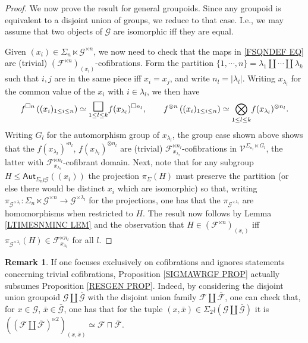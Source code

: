 \documentclass[a4paper,10pt
,draft
]{article}%
\numberwithin{equation}{section}
\numberwithin{figure}{section}
\theoremstyle{definition} %
\newtheorem{remark}[equation]{Remark}%
\newcommand{\F}{\ensuremath{\mathcal F}}
\newcommand{\V}{\ensuremath{\mathcal V}}
\newcommand{\G}{\ensuremath{\mathcal G}}
\newcommand{\1}{\ensuremath{\mathbbm 1}}%
\begin{document}
\begin{proof}
We now prove the result for general groupoids.
Since any groupoid is equivalent to a disjoint union of groups, 
we reduce to that case. I.e., we may assume that two objects of $\G$ are isomorphic iff they are equal.

Given $(x_i) \in \Sigma_n \ltimes \G^{\times n}$,
we now need to check that the maps in \eqref{FSQNDEF EQ}
are (trivial) $\left(\F^{\ltimes n}\right)_{(x_i)}$-cofibrations.
Form the partition 
$\{1,\cdots,n\} = \lambda_1 \amalg \cdots \amalg \lambda_k$
such that $i,j$ are in the same piece iff $x_i=x_j$, and write
$n_l = |\lambda_l|$.
Writing $x_{\lambda_l}$ for the common value of the $x_i$ with $i\in \lambda_l$, we then have
\[
f^{\square n}\left((x_i)_{1\leq i \leq n }\right)
\simeq
\underset{1\leq l \leq k}{\mathlarger{\mathlarger{\mathlarger{\square}}}} f(x_{\lambda_l})^{\square n_l},
\qquad
f^{\otimes n}\left((x_i)_{1\leq i \leq n }\right)
\simeq
\underset{1\leq l \leq k}{\bigotimes} f(x_{\lambda_l})^{\otimes n_l}.
\]
Writing $G_l$ for the automorphism group of $x_{\lambda_l}$,
the group case shown above shows that the
$f(x_{\lambda_l})^{\square n_l}$,
$f(x_{\lambda_l})^{\otimes n_l}$
are (trivial) $\F_{x_{\lambda_l}}^{\ltimes n_l}$-cofibrations
in $\V^{\Sigma_{n_l}\ltimes G_l}$,
the latter with 
$\F_{x_{\lambda_l}}^{\ltimes n_l}$-cofibrant domain.
%
Next, note that for any subgroup
$H \leq \mathsf{Aut}_{\Sigma_n \wr \G}((x_i))$ the projection 
$\pi_{\Sigma}(H)$ must preserve the partition 
(or else there would be distinct $x_i$ which are isomorphic) 
so that, writing 
$\pi_{\G^{\times \lambda_l}} \colon
\Sigma_n \ltimes \G^{\times n} \to \G^{\times \lambda_l}$
for the projections,
one has that the 
$\pi_{\G^{\times \lambda_l}}$ are homomorphisms when restricted to $H$. The result now follows by Lemma \ref{LTIMESNMINC LEM}
and the observation that
$H \in \left(\F^{\ltimes n}\right)_{(x_i)}$
iff
$\pi_{\G^{\times \lambda_l}}(H) \in \F_{x_{\lambda_l}}^{\ltimes n_l}$
for all $l$.
\end{proof}


\begin{remark}
If one focuses exclusively on cofibrations and ignores statements concerning trivial cofibrations,
Proposition \ref{SIGMAWRGF PROP} actually subsumes Proposition \ref{RESGEN PROP}. 
Indeed, by considering the disjoint union groupoid 
$\G \amalg \bar{\G}$
with the disjoint union family 
$\F \amalg \bar{\F}$,
one can check that, for
$x \in \G$, $\bar{x} \in \bar{\G}$,
one has that for the tuple $(x,\bar{x}) \in \Sigma_2 \wr (\G \amalg \bar{\G})$
it is
$\left(\left(\F \amalg \bar{\F}\right)^{\ltimes 2}\right)_{(x,\bar{x})} \simeq \F \sqcap \bar{\F}$.
\end{remark}
\end{document}
